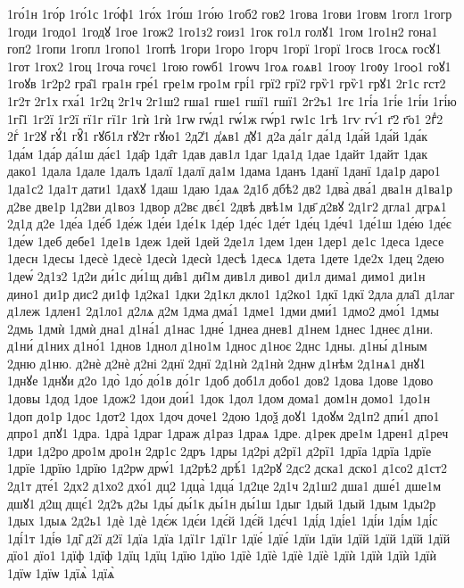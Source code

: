 {1го́1н
1го́р
1го́1с
1го́ф1
1го́х
1го́ш
1го́ю
1гоб2
гов2
1гова
1гови
1говм
1гогл
1гогр
1годи
1годо1
1годꙋ
1гое
1гож2
1го1з2
гоиз1
1гок
го1л
голꙋ1
1гом
1го1н2
гона1
гоп2
1гопи
1гопл
1гопо1
1гопѣ
1гори
1горо
1горч
1горї
1горї
1госв
1госѧ
госꙋ1
1гот
1гох2
1гоц
1гоча
гочє1
1гою
гоѡб1
1гоѡч
1гоѧ
гоѧв1
1гоѹ
1гоᲂу
1гоѻ1
гоꙋ1
1гоꙋв
1г2р2
гра̑1
гра1н
гре́1
гре1м
гро1м
грі́1
грї2
грї2
грѷ1
грѷ1
грꙋ1
2г1с
гст2
1г2т
2г1х
гха́1
1г2ц
2г1ч
2г1ш2
гша1
гше1
гшї1
гшї1
2г2ъ1
1гє
1гі́а
1гі́е
1гі́и
1гі́ю
1гі̑1
1г2ї
1г2ї
гї1г
гї1г
1гѝ
1гѝ
1гѡ
гѡ́д1
гѡ́1ж
гѡ́р1
гѡ1с
1гѣ
1гѵ
гѵ́1
г҃2
г҃о1
2гⷣ2
2гⷭ
1г2ꙋ
гꙋ́1
гꙋ̑1
гꙋб1л
гꙋ2т
гꙋю1
2д2̾1
д̾ѧв1
д̾ꙋ1
д2а
да́1г
да́1д
1да́й
1да́й
1да́к
1да́м
1да́р
да́1ш
да́є1
1да̑р
1да̑т
1дав
дав1л
1даг
1да1д
1дае
1дайт
1дайт
1дак
дако1
1дала
1дале
1далъ
1далї
1далї
да1м
1дама
1данъ
1данї
1данї
1да1р
даро1
1да1с2
1да1т
дати1
1дахꙋ
1даш
1даю
1даѧ
2д1б
дбѣ2
дв2
1два̀
два́1
два1н
д1ва1р
д2ве
две1р
1д2ви
д1воз
1двор
д2вє
двє́1
2двѣ
двѣ1м
1дв҃
д2вꙋ
2д1г2
дгла1
дгрѧ1
2д1д
д2е
1де́а
1де́б
1де́ж
1де́и
1де́1к
1де́р
1де́с
1де́т
1де́ц
1де́ч1
1де́1ш
1де́ю
1де́є
1де́ѡ
1деб
дебе1
1де1в
1деж
1дей
1дей
2де1л
1дем
1ден
1дер1
де1с
1деса
1десе
1десн
1десы
1десѐ
1десѐ
1десѝ
1десѝ
1десѣ
1десѧ
1дета
1дете
1де2х
1дец
2дею
1деѡ́
2д1з2
1д2и
ди́1с
ди́1щ
ди̑в1
ди̑1м
див1л
диво1
ди1л
дима1
димо1
ди1н
дино1
ди1р
дис2
ди1ф
1д2ка1
1дки
2д1кл
дкло1
1д2ко1
1дкї
1дкї
2дла
дла̑1
д1лаг
д1леж
1длен1
2д1ло1
д2лѧ
д2м
1дма
дма́1
1дме1
1дми
дми́1
1дмо2
дмо́1
1дмы
2дмь
1дмѝ
1дмѝ
дна1
д1на́1
д1нас
1дне́
1днеа
днев1
д1нем
1днес
1днеє
д1ни.
д1ни́
д1них
д1но́1
1днов
1днол
д1но1м
1днос
д1ноє
2днс
1дны.
д1ны́
д1ным
2дню
д1ню.
д2нѐ
д2нѐ
д2ні
2днї
2днї
2д1нѝ
2д1нѝ
2днѡ
д1нѣм
2д1нѧ1
днꙋ1
1днꙋе
1днꙋи
д2о
1до̀
1до́
до́1в
до́1г
1доб
доб1л
добо1
дов2
1дова
1дове
1дово
1довы
1дод
1дое
1дож2
1дои
дои́1
1док
1дол
1дом
дома1
дом1н
домо1
1до1н
1доп
до1р
1дос
1дот2
1дох
1доч
доче1
2дою
1доѯ
доꙋ1
1доꙋм
2д1п2
дпи́1
дпо1
дпро1
дпꙋ1
1дра.
1дра̀
1драг
1драж
д1раз
1драѧ
1дре.
д1рек
дре1м
1дрен1
д1реч
1дри
1д2ро
дро1м
дро1н
2др1с
2дръ
1дры
1д2рі
д2рї1
д2рї1
1дрїа
1дрїа
1дрїе
1дрїе
1дрїю
1дрїю
1д2рѡ
дрѡ́1
1д2рѣ2
дрѣ́1
1д2рꙋ
2дс2
дска1
дско1
д1со2
д1ст2
2д1т
дте́1
2дх2
д1хо2
дхо́1
дц2
1дца̀
1дца́
1д2це
2д1ч
2д1ш2
дша1
дше́1
дше1м
дшꙋ1
д2щ
дщє́1
2д2ъ
д2ы
1ды́
ды́1к
ды́1н
ды́1ш
1дыг
1дый
1дый
1дым
1ды2р
1дых
1дыѧ
2д2ь1
1дѐ
1дѐ
1дє́ж
1дє́и
1дє́й
1дє́й
1дє́ч1
1ді́д
1ді́е1
1ді́и
1ді́м
1ді́с
1ді́1т
1ді́ѳ
1ді̑
д2ї
д2ї
1дїа
1дїа
1дї1г
1дї1г
1дїе́
1дїе́
1дїи
1дїи
1дїй
1дїй
1дїй
1дїй
дїо1
дїо1
1дїф
1дїф
1дїц
1дїц
1дїю
1дїю
1дїѐ
1дїѐ
1дїѐ
1дїѐ
1дїѝ
1дїѝ
1дїѝ
1дїѝ
1дїѡ
1дїѡ
1дїѧ̀
1дїѧ̀
}
